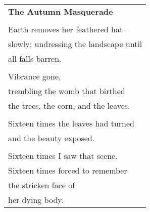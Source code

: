 \documentclass{article}
\begin{document}
\begin{center}
\begin{tabular}{l}
\textbf{The Autumn Masquerade} \\
\\
Earth removes her feathered hat-- \\
slowly; undressing the landscape until \\
all falls barren. \\
\\
Vibrance gone, \\
trembling the womb that birthed \\
the trees, the corn, and the leaves. \\
\\
Sixteen times the leaves had turned \\
and the beauty exposed. \\
\\
Sixteen times I saw that scene. \\
Sixteen times forced to remember \\
the stricken face of \\
her dying body. \\
\end{tabular}
\end{center}
\end{document}
